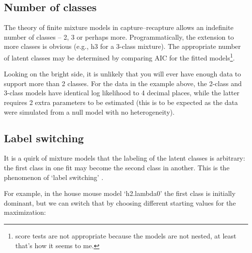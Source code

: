 \documentclass[
]{book}
\begin{document}
\subsection{Number of classes}\label{number-of-classes}

The theory of finite mixture models in capture--recapture \citep{p2000} allows an indefinite number of classes -- 2, 3 or perhaps more. Programmatically, the extension to more classes is obvious (e.g., h3 for a 3-class mixture). The appropriate number of latent classes may be determined by comparing AIC for the fitted models\footnote{score tests \citep{McCrea2010} are not appropriate because the models are not nested, at least that's how it seems to me.}.

Looking on the bright side, it is unlikely that you will ever have enough data to support more than 2 classes. For the data in the example above, the 2-class and 3-class models have identical log likelihood to 4 decimal places, while the latter requires 2 extra parameters to be estimated (this is to be expected as the data were simulated from a null model with no heterogeneity).

\subsection{Label switching}\label{label-switching}

It is a quirk of mixture models that the labeling of the latent classes is arbitrary: the first class in one fit may become the second class in another. This is the phenomenon of `label switching' \citep{Stephens2000}.

For example, in the house mouse model `h2.lambda0' the first class is initially dominant, but we can switch that by choosing different starting values for the maximization:
\end{document}
